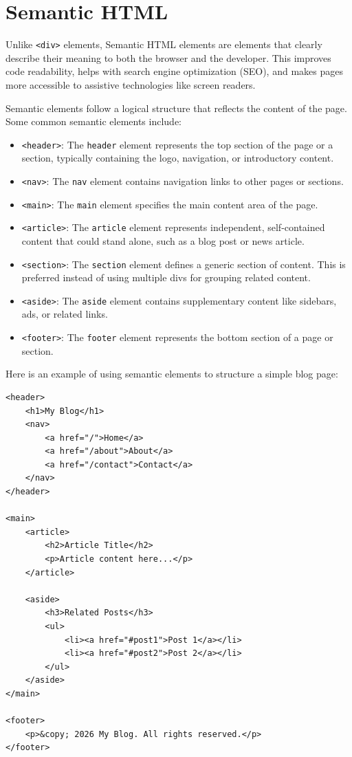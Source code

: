 \section{Semantic HTML}
Unlike \verb|<div>| elements, Semantic HTML elements are elements that clearly describe their meaning to both the browser
and the developer. This improves code readability, helps with search engine optimization (SEO), and makes pages
more accessible to assistive technologies like screen readers.

Semantic elements follow a logical structure that reflects the content of the page. Some common semantic elements include:

\begin{itemize}
    \item \verb|<header>|: The \verb|header| element represents the top section of the page or a section,
      typically containing the logo, navigation, or introductory content.
    \item \verb|<nav>|: The \verb|nav| element contains navigation links to other pages or sections.
    \item \verb|<main>|: The \verb|main| element specifies the main content area of the page.
    \item \verb|<article>|: The \verb|article| element represents independent, self-contained content that could
      stand alone, such as a blog post or news article.
    \item \verb|<section>|: The \verb|section| element defines a generic section of content. This is preferred instead of using multiple divs for grouping related content.
    \item \verb|<aside>|: The \verb|aside| element contains supplementary content like sidebars, ads, or related links.
    \item \verb|<footer>|: The \verb|footer| element represents the bottom section of a page or section.
\end{itemize}

Here is an example of using semantic elements to structure a simple blog page:

\begin{verbatim}
<header>
    <h1>My Blog</h1>
    <nav>
        <a href="/">Home</a>
        <a href="/about">About</a>
        <a href="/contact">Contact</a>
    </nav>
</header>

<main>
    <article>
        <h2>Article Title</h2>
        <p>Article content here...</p>
    </article>

    <aside>
        <h3>Related Posts</h3>
        <ul>
            <li><a href="#post1">Post 1</a></li>
            <li><a href="#post2">Post 2</a></li>
        </ul>
    </aside>
</main>

<footer>
    <p>&copy; 2026 My Blog. All rights reserved.</p>
</footer>
\end{verbatim}

